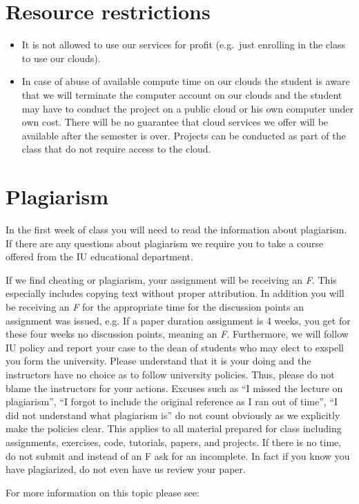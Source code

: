 \section{Resource restrictions}

\begin{itemize}
\item It is not allowed to use our services for profit (e.g.\ just
  enrolling in the class to use our clouds).
\item In case of abuse of available compute time on our clouds the
  student is aware that we will terminate the computer account on our
  clouds and the student may have to conduct the project on a public cloud or
  his own computer under own cost. There will be no guarantee that
  cloud services we offer will be available after the semester is
  over.  Projects can be conducted as part of the class that do not
  require access to the cloud.
\end{itemize}


\section{Plagiarism}

In the first week of class you will need to read the information about
plagiarism. If there are any questions about plagiarism we require you
to take a course offered from the IU educational department.

\begin{WARNING}
  If we find cheating or plagiarism, your assignment will be receiving
  an \textit{F}. This especially includes copying text without proper
  attribution. In addition you will be receiving an \textit{F} for the
  appropriate time for the discussion points an assignment was issued,
  e.g. If a paper duration assignment is 4 weeks, you get for these
  four weeks no discussion points, meaning an \textit{F}. Furthermore, we
  will follow IU policy and report your case to the dean of students
  who may elect to exspell you form the university. Please understand
  that it is your doing and the instructors have no choice as to
  follow university policies. Thus, please do not blame the
  instructors for your actions. Excuses such as ``I missed the lecture
  on plagiarism'', ``I forgot to include the original reference as I
  ran out of time'', ``I did not understand what plagiarism is'' do
  not count obviously as we explicitly make the policies clear. This
  applies to all material prepared for class including assignments,
  exercises, code, tutorials, papers, and projects. If there is no
  time, do not submit and instead of an F ask for an incomplete. In
  fact if you know you have plagiarized, do not even have us review
  your paper. 
\end{WARNING}

For more information on this topic please see:

